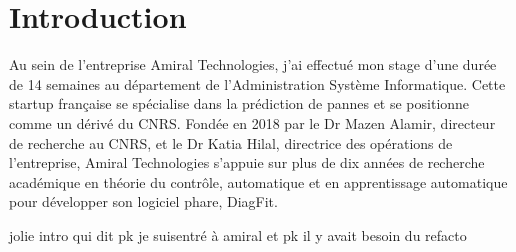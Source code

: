\section{Introduction}
Au sein de l'entreprise Amiral Technologies, j'ai effectué mon stage d'une durée de 14 semaines au département de l'Administration Système Informatique.
Cette startup française se spécialise dans la prédiction de pannes et se positionne comme un dérivé du CNRS.
Fondée en 2018 par le Dr Mazen Alamir, directeur de recherche au CNRS, et le Dr Katia Hilal, directrice des opérations de l'entreprise, Amiral Technologies s'appuie sur plus de dix années de recherche académique en théorie du contrôle, automatique et en apprentissage automatique pour développer son logiciel phare, DiagFit.

jolie intro qui dit pk je suisentré à amiral et pk il y avait besoin du refacto
